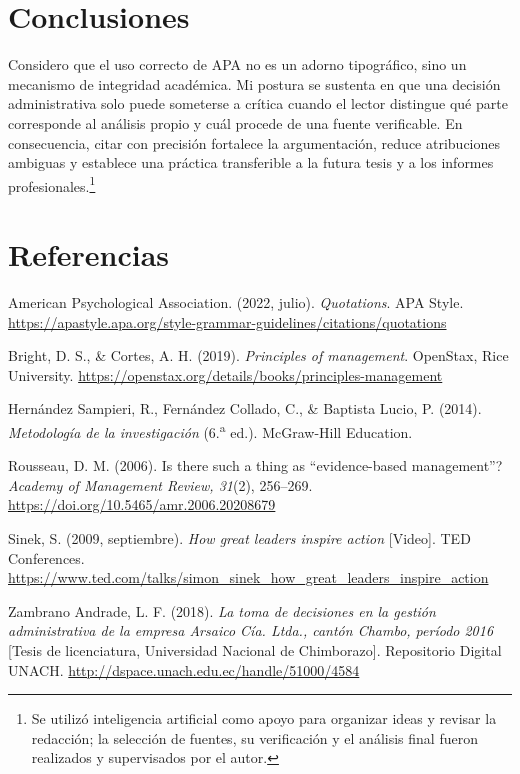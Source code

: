 \documentclass[spanish,letterpaper,oneside]{article}
\newenvironment{apareferences}{%
  \begin{list}{}{\setlength{\leftmargin}{1.27cm}%
    \setlength{\itemindent}{-1.27cm}%
    \setlength{\itemsep}{0.8\baselineskip}%
    \setlength{\parsep}{0pt}}}{\end{list}}
\begin{document}
\section{Conclusiones}

Considero que el uso correcto de APA no es un adorno tipográfico, sino un mecanismo de integridad académica. Mi postura se sustenta en que una decisión administrativa solo puede someterse a crítica cuando el lector distingue qué parte corresponde al análisis propio y cuál procede de una fuente verificable. En consecuencia, citar con precisión fortalece la argumentación, reduce atribuciones ambiguas y establece una práctica transferible a la futura tesis y a los informes profesionales.\footnote{Se utilizó inteligencia artificial como apoyo para organizar ideas y revisar la redacción; la selección de fuentes, su verificación y el análisis final fueron realizados y supervisados por el autor.}

\clearpage
\section*{Referencias}
\begin{apareferences}
  \item American Psychological Association. (2022, julio). \emph{Quotations}. APA Style. \url{https://apastyle.apa.org/style-grammar-guidelines/citations/quotations}

  \item Bright, D. S., \& Cortes, A. H. (2019). \emph{Principles of management}. OpenStax, Rice University. \url{https://openstax.org/details/books/principles-management}

  \item Hernández Sampieri, R., Fernández Collado, C., \& Baptista Lucio, P. (2014). \emph{Metodología de la investigación} (6.\textsuperscript{a} ed.). McGraw-Hill Education.

  \item Rousseau, D. M. (2006). Is there such a thing as ``evidence-based management''? \emph{Academy of Management Review, 31}(2), 256--269. \url{https://doi.org/10.5465/amr.2006.20208679}

  \item Sinek, S. (2009, septiembre). \emph{How great leaders inspire action} [Video]. TED Conferences. \url{https://www.ted.com/talks/simon_sinek_how_great_leaders_inspire_action}

  \item Zambrano Andrade, L. F. (2018). \emph{La toma de decisiones en la gestión administrativa de la empresa Arsaico Cía. Ltda., cantón Chambo, período 2016} [Tesis de licenciatura, Universidad Nacional de Chimborazo]. Repositorio Digital UNACH. \url{http://dspace.unach.edu.ec/handle/51000/4584}
\end{apareferences}
\end{document}
